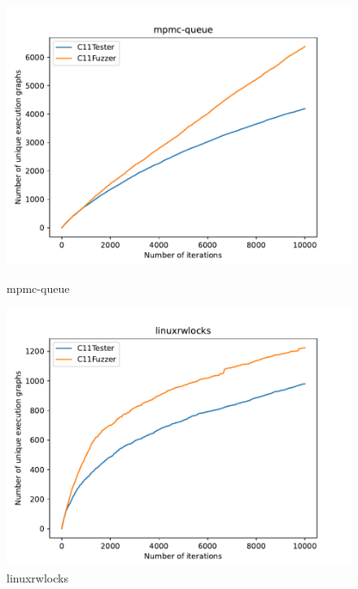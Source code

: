 \begin{figure}[H]
	\begin{minipage}{0.45\textwidth}
		\centering
		\includegraphics[width=\textwidth]{figure/mpmc-queue.pdf}
		\caption{mpmc-queue}
		\label{cover-plot1-mpmc-queue}
	\end{minipage}
	\hfill
	\begin{minipage}{0.45\textwidth}
		\centering
		\includegraphics[width=\textwidth]{figure/linuxrwlocks.pdf}
		\caption{linuxrwlocks}
		\label{cover-plot1-linuxrwlocks}
	\end{minipage}

	\vspace{0.5cm}


\end{figure}
